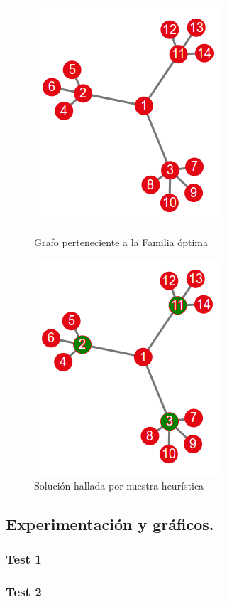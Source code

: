 \begin{figure}[!htb]
\begin{center}
  \includegraphics[scale=0.5]{imagenes/familia3.png}
\end{center}
  \caption{Grafo perteneciente a la Familia óptima}\label{fig:familia3}
\endminipage\hfill
{}
\begin{center}
  \includegraphics[scale=0.5]{imagenes/familia3-res.png}
\end{center}
  \caption{Solución hallada por nuestra heurística}\label{fig:familia3res}
\endminipage
\end{figure}


\vspace*{0.6cm}

\subsection{Experimentación y gráficos.}

\vspace*{0.3cm}

\vspace*{0.6cm}

\subsubsection{Test 1}
\vspace*{0.3cm}

\vspace*{0.6cm}

\subsubsection{Test 2}

